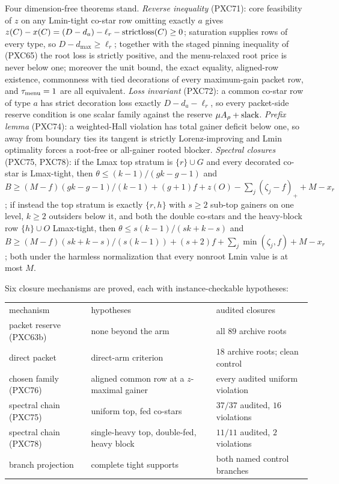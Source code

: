 \documentclass[11pt]{article}
\begin{document}
Four dimension-free theorems stand.  \emph{Reverse inequality} (PXC71):
core feasibility of $z$ on any Lmin-tight co-star row omitting exactly
$a$ gives $z(C)-x(C)=(D-d_a)-\ell_r-{\rm strictloss}(C)\ge0$; saturation
supplies rows of every type, so $D-d_{\max}\ge\ell_r$; together with
the staged pinning inequality of (PXC65) the root loss is strictly
positive, and the menu-relaxed root price is never below one;
moreover the unit bound, the exact equality, aligned-row existence,
commonness with tied decorations of every maximum-gain packet row, and
$\tau_{\rm menu}=1$ are all equivalent.  \emph{Loss invariant} (PXC72):
a common co-star row of type $a$ has strict decoration loss exactly
$D-d_a-\ell_r$, so every packet-side reserve condition is one scalar
family against the reserve $\mu A_\rho+{\rm slack}$.  \emph{Prefix
lemma} (PXC74): a weighted-Hall violation has total gainer deficit below
one, so away from boundary ties its tangent is strictly
Lorenz-improving and Lmin optimality forces a root-free or all-gainer
rooted blocker.  \emph{Spectral closures} (PXC75, PXC78): if the Lmax
top stratum is $\{r\}\cup G$ and every decorated co-star is Lmax-tight,
then $\theta\le(k-1)/(gk-g-1)$ and
$B\ge(M-f)(gk-g-1)/(k-1)+(g+1)f+z(O)-\sum_j(\zeta_j-f)_++M-x_r$; if
instead the top stratum is exactly $\{r,h\}$ with $s\ge2$ sub-top
gainers on one level, $k\ge2$ outsiders below it, and both the double
co-stars and the heavy-block row $\{h\}\cup O$ Lmax-tight, then
$\theta\le s(k-1)/(sk+k-s)$ and
$B\ge(M-f)(sk+k-s)/(s(k-1))+(s+2)f+\sum_j\min(\zeta_j,f)+M-x_r$; both
under the harmless normalization that every nonroot Lmin value is at
most $M$.

Six closure mechanisms are proved, each with instance-checkable
hypotheses:

\begin{center}
\footnotesize
\begin{tabular}{lll}
mechanism & hypotheses & audited closures \\[2pt]
packet reserve (PXC63b) & none beyond the arm & all $89$ archive roots \\
direct packet & direct-arm criterion & $18$ archive roots; clean control \\
chosen family (PXC76) & aligned common row at a $z$-maximal gainer &
every audited uniform violation \\
spectral chain (PXC75) & uniform top, fed co-stars &
$37/37$ audited, $16$ violations \\
spectral chain (PXC78) & single-heavy top, double-fed, heavy block &
$11/11$ audited, $2$ violations \\
branch projection & complete tight supports &
both named control branches \\
\end{tabular}
\end{center}
\end{document}
